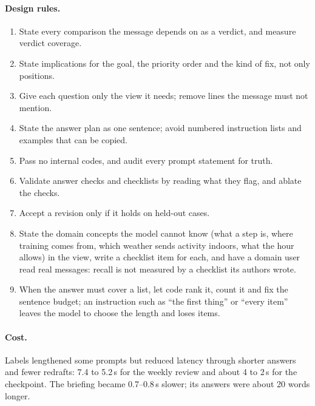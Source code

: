 \documentclass[10pt,twocolumn]{article}
\begin{document}
\paragraph{Design rules.}
\begin{enumerate}[label=R\arabic*.]
\item State every comparison the message depends on as a verdict, and measure verdict coverage.
\item State implications for the goal, the priority order and the kind of fix, not only positions.
\item Give each question only the view it needs; remove lines the message must not mention.
\item State the answer plan as one sentence; avoid numbered instruction lists and examples that can be copied.
\item Pass no internal codes, and audit every prompt statement for truth.
\item Validate answer checks and checklists by reading what they flag, and ablate the checks.
\item Accept a revision only if it holds on held-out cases.
\item State the domain concepts the model cannot know (what a step is, where training comes from, which weather sends
activity indoors, what the hour allows) in the view, write a checklist item for each, and have a domain user read real
messages: recall is not measured by a checklist its authors wrote.
\item When the answer must cover a list, let code rank it, count it and fix the sentence budget; an instruction such as
``the first thing'' or ``every item'' leaves the model to choose the length and loses items.
\end{enumerate}

\paragraph{Cost.} Labels lengthened some prompts but reduced latency through shorter answers and fewer redrafts:
7.4 to 5.2\,s for the weekly review and about 4 to 2\,s for the checkpoint. The briefing became 0.7--0.8\,s slower;
its answers were about 20 words longer.
\end{document}
